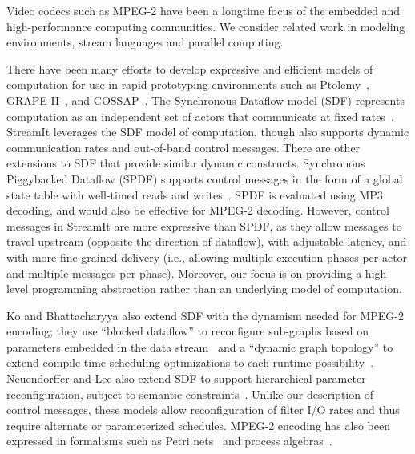 

Video codecs such as MPEG-2 have been a longtime focus of the embedded
and high-performance computing communities.  We consider related work
in modeling environments, stream languages and parallel computing.

There have been many efforts to develop expressive and efficient
models of computation for use in rapid prototyping environments such
as Ptolemy~\cite{ptolemy03overview}, GRAPE-II~\cite{grape-ii}, and
COSSAP~\cite{cossap}.  The Synchronous Dataflow model (SDF) represents
computation as an independent set of actors that communicate at fixed
rates~\cite{lee87static}.  StreamIt leverages the SDF model of
computation, though also supports dynamic communication rates and
out-of-band control messages.  There are other extensions to SDF that
provide similar dynamic constructs.  Synchronous Piggybacked Dataflow
(SPDF) supports control messages in the form of a global state table
with well-timed reads and writes~\cite{park99spdf2,park02spdf3}.  SPDF
is evaluated using MP3 decoding, and would also be effective for
MPEG-2 decoding.  However, control messages in StreamIt are more
expressive than SPDF, as they allow messages to travel upstream
(opposite the direction of dataflow), with adjustable latency, and
with more fine-grained delivery (i.e., allowing multiple execution
phases per actor and multiple messages per phase).  Moreover, our
focus is on providing a high-level programming abstraction rather than
an underlying model of computation.

Ko and Bhattacharyya also extend SDF with the dynamism needed for
MPEG-2 encoding; they use ``blocked dataflow'' to reconfigure
sub-graphs based on parameters embedded in the data
stream~\cite{bhatta05block} and a ``dynamic graph topology'' to extend
compile-time scheduling optimizations to each runtime
possibility~\cite{ko05dgt}. Neuendorffer and Lee also extend SDF to
support hierarchical parameter reconfiguration, subject to semantic
constraints~\cite{neuendorffer04hierarchical}.  Unlike our description
of control messages, these models allow reconfiguration of filter I/O
rates and thus require alternate or parameterized schedules.  MPEG-2
encoding has also been expressed in formalisms such as Petri
nets~\cite{valero02petri} and process algebras~\cite{pelayo01rosa}.

